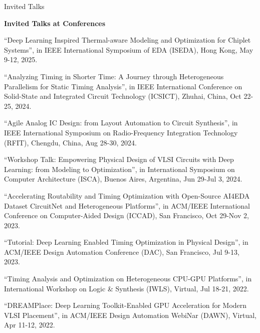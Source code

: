 \begin{rSection}{Invited Talks}

\textbf{Invited Talks at Conferences}
        
\begin{description}[font=\normalfont]

\item[{[12]}]{
``Deep Learning Inspired Thermal-aware Modeling and Optimization for Chiplet Systems'', in IEEE International Symposium of EDA (ISEDA), Hong Kong, May 9-12, 2025. 
}

\item[{[11]}]{
``Analyzing Timing in Shorter Time: A Journey through Heterogeneous Parallelism for Static Timing Analysis'', in IEEE International Conference on Solid-State and Integrated Circuit Technology (ICSICT), Zhuhai, China, Oct 22-25, 2024. 
}

\item[{[10]}]{
``Agile Analog IC Design: from Layout Automation to Circuit Synthesis'', in IEEE International Symposium on Radio-Frequency Integration Technology (RFIT), Chengdu, China, Aug 28-30, 2024. 
}

\item[{[9]}]{
``Workshop Talk: Empowering Physical Design of VLSI Circuits with Deep Learning: from Modeling to Optimization'', in International Symposium on Computer Architecture (ISCA), Buenos Aires, Argentina, Jun 29-Jul 3, 2024. 
}

\item[{[8]}]{
``Accelerating Routability and Timing Optimization with Open-Source AI4EDA Dataset CircuitNet and Heterogeneous Platforms'', in ACM/IEEE International Conference on Computer-Aided Design (ICCAD), San Francisco, Oct 29-Nov 2, 2023. 
}

\item[{[7]}]{
``Tutorial: Deep Learning Enabled Timing Optimization in Physical Design'', in ACM/IEEE Design Automation Conference (DAC), San Francisco, Jul 9-13, 2023. 
}

\item[{[6]}]{
``Timing Analysis and Optimization on Heterogeneous CPU-GPU Platforms'', in International Workshop on Logic \& Synthesis (IWLS), Virtual, Jul 18-21, 2022. 
}

\item[{[5]}]{
``DREAMPlace: Deep Learning Toolkit-Enabled GPU Acceleration for Modern VLSI Placement'', in ACM/IEEE Design Automation WebiNar (DAWN), Virtual, Apr 11-12, 2022. 
}


\end{description}
\end{rSection}
